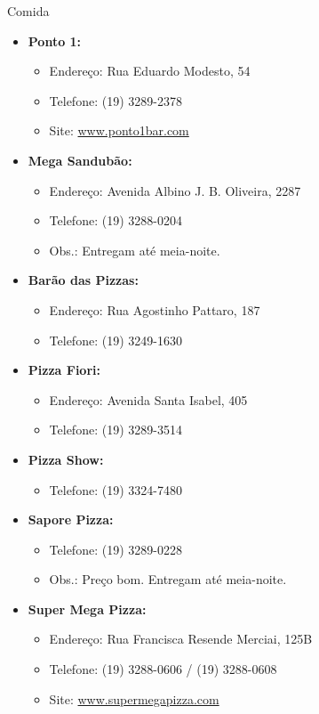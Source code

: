 \begin{story}{Comida}
\begin{itemize}
\item \textbf{Ponto 1:}
\begin{itemize}
\item Endereço: Rua Eduardo Modesto, 54
\item Telefone: (19) 3289-2378
\item Site: \url{www.ponto1bar.com}
\end{itemize}

\item \textbf{Mega Sandubão:}
\begin{itemize}
\item Endereço: Avenida Albino J. B. Oliveira, 2287
\item Telefone: (19) 3288-0204
\item Obs.: Entregam até meia-noite.
\end{itemize}

\item \textbf{Barão das Pizzas:}
\begin{itemize}
\item Endereço: Rua Agostinho Pattaro, 187
\item Telefone: (19) 3249-1630
\end{itemize}

\item \textbf{Pizza Fiori:}
\begin{itemize}
\item Endereço: Avenida Santa Isabel, 405
\item Telefone: (19) 3289-3514
\end{itemize}

\item \textbf{Pizza Show:}
\begin{itemize}
\item Telefone: (19) 3324-7480
\end{itemize}

\item \textbf{Sapore Pizza:}
\begin{itemize}
\item Telefone: (19) 3289-0228
\item Obs.: Preço bom. Entregam até meia-noite. 
\end{itemize}

\item \textbf{Super Mega Pizza:}
\begin{itemize}
\item Endereço: Rua Francisca Resende Merciai, 125B
\item Telefone: (19) 3288-0606 / (19) 3288-0608
\item Site: \url{www.supermegapizza.com}
\end{itemize}


\end{itemize}
\end{story}
